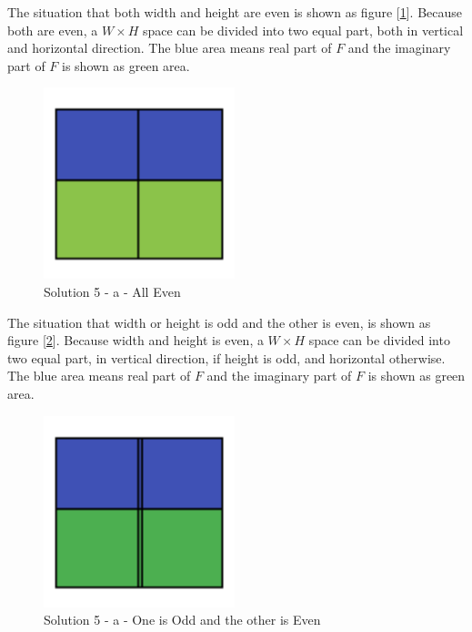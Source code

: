 \documentclass{article}
\begin{document}
The situation that both width and height are even is shown as figure [\ref{fig:5a-all-even}].
Because both are even, a $W\times H$ space can be divided into two equal part, both in vertical and horizontal direction.
The blue area means real part of $F$ and the imaginary part of $F$ is shown as green area. 
\begin{figure}[!h]
  \centering
  \includegraphics[height=15em]{"./All-even.png"}
  \caption{Solution 5 - a - All Even}
  \label{fig:5a-all-even}
\end{figure}

The situation that width or height is odd and the other is even, is shown as figure [\ref{fig:5a-either}]. 
Because width and height is even, a $W\times H$ space can be divided into two equal part, in vertical direction, if height is odd, and horizontal otherwise.
The blue area means real part of $F$ and the imaginary part of $F$ is shown as green area.
\begin{figure}[!h]
  \centering
  \includegraphics[height=15em]{"./Either.png"}
  \caption{Solution 5 - a - One is Odd and the other is Even}
  \label{fig:5a-either}
\end{figure}
\end{document}
